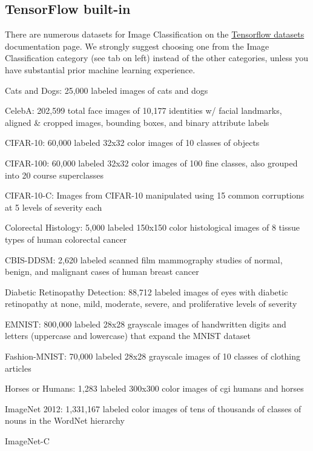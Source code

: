 \documentclass{tufte-handout}
\begin{document}
\subsection{TensorFlow built-in}\label{tensorflow-built-in-datasets}

There are numerous datasets for Image Classification on the \href{https://www.tensorflow.org/datasets/catalog/beans}{Tensorflow datasets} documentation page. We strongly suggest choosing one from the Image Classification category (see tab on left) instead of the other categories, unless you have substantial prior machine learning experience. 

\bi
\item
Cats and Dogs: 25,000 labeled images of cats and dogs
\item
CelebA: 202,599 total face images of 10,177 identities w/ facial landmarks,
  aligned \& cropped images, bounding boxes, and binary attribute labels
\item
  CIFAR-10:
  60,000 labeled 32x32 color images of 10 classes of objects
\item
CIFAR-100:
  60,000 labeled 32x32 color images of 100 fine classes, also grouped
  into 20 course superclasses
\item
 CIFAR-10-C:
  Images from CIFAR-10 manipulated using 15 common corruptions at 5
  levels of severity each
\item
Colorectal Histology: 5,000 labeled 150x150 color histological images of 8
  tissue types of human colorectal cancer
\item
CBIS-DDSM:
  2,620 labeled scanned film mammography studies of normal, benign, and
  malignant cases of human breast cancer
\item
 Diabetic
  Retinopathy Detection: 88,712 labeled images of eyes with diabetic
  retinopathy at none, mild, moderate, severe, and proliferative levels
  of severity
\item
EMNIST:
  800,000 labeled 28x28 grayscale images of handwritten digits and
  letters (uppercase and lowercase) that expand the MNIST dataset
\item
  Fashion-MNIST:
  70,000 labeled 28x28 grayscale images of 10 classes of clothing
  articles
\item
 Horses
  or Humans: 1,283 labeled 300x300 color images of cgi humans and
  horses
\item
ImageNet
  2012: 1,331,167 labeled color images of tens of thousands of classes
  of nouns in the WordNet hierarchy
\item
  ImageNet-C
\end{document}
